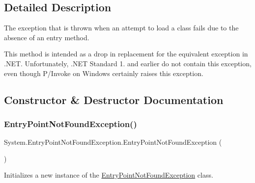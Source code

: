 \subsection{Detailed Description}
The exception that is thrown when an attempt to load a class fails due to the absence of an entry method. 

This method is intended as a drop in replacement for the equivalent exception in .N\+ET. Unfortunately, .N\+ET Standard 1. and earlier do not contain this exception, even though P/\+Invoke on Windows certainly raises this exception. 

\subsection{Constructor \& Destructor Documentation}
\mbox{\label{class_system_1_1_entry_point_not_found_exception_a535242a8f320d40eb79eb5e7762508df}} 
\subsubsection{\texorpdfstring{EntryPointNotFoundException()}{EntryPointNotFoundException()}\hspace{0.1cm}{\footnotesize\ttfamily [1/3]}}
{\footnotesize\ttfamily System.\+Entry\+Point\+Not\+Found\+Exception.\+Entry\+Point\+Not\+Found\+Exception (\begin{DoxyParamCaption}{ }\end{DoxyParamCaption})}



Initializes a new instance of the \mbox{\hyperlink{class_system_1_1_entry_point_not_found_exception}{Entry\+Point\+Not\+Found\+Exception}} class. 

\mbox{\label{class_system_1_1_entry_point_not_found_exception_a825c6ef95a46adc36eea896ab51479e4}} 
